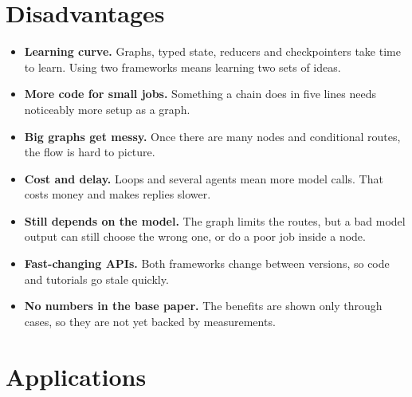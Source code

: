 \documentclass[12pt,a4paper]{report}
\begin{document}
\chapter{Disadvantages}

\begin{itemize}
    \item \textbf{Learning curve.} Graphs, typed state, reducers and checkpointers take time to learn. Using two frameworks means learning two sets of ideas.
    \item \textbf{More code for small jobs.} Something a chain does in five lines needs noticeably more setup as a graph.
    \item \textbf{Big graphs get messy.} Once there are many nodes and conditional routes, the flow is hard to picture.
    \item \textbf{Cost and delay.} Loops and several agents mean more model calls. That costs money and makes replies slower.
    \item \textbf{Still depends on the model.} The graph limits the routes, but a bad model output can still choose the wrong one, or do a poor job inside a node.
    \item \textbf{Fast-changing APIs.} Both frameworks change between versions, so code and tutorials go stale quickly.
    \item \textbf{No numbers in the base paper.} The benefits are shown only through cases, so they are not yet backed by measurements.
\end{itemize}

\chapter{Applications}
\end{document}
